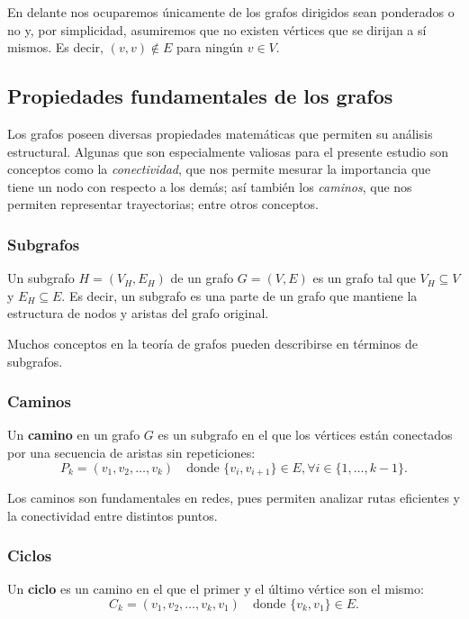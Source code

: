 \documentclass[openany]{book}
\begin{document}
			En delante nos ocuparemos únicamente de los grafos dirigidos sean ponderados o no y, por simplicidad, asumiremos que no existen vértices que se dirijan a sí mismos. Es decir, $(v, v) \notin E$ para ningún $v \in V$.

		
		\subsection{Propiedades fundamentales de los grafos}
			Los grafos poseen diversas propiedades matemáticas que permiten su análisis estructural.
			Algunas que son especialmente valiosas para el presente estudio son conceptos como la \textit{conectividad}, que nos permite mesurar la importancia que tiene un nodo con respecto a los demás; así también los \textit{caminos}, que nos permiten representar trayectorias; entre otros conceptos.
			
			\subsubsection{Subgrafos}
			
			Un subgrafo $H = (V_H, E_H)$ de un grafo $G = (V, E)$ es un grafo tal que $V_H \subseteq V$ y $E_H \subseteq E$.
			Es decir, un subgrafo es una parte de un grafo que mantiene la estructura de nodos y aristas del grafo original.
			
			Muchos conceptos en la teoría de grafos pueden describirse en términos de subgrafos.
			
			\subsubsection{Caminos}
			
			Un \textbf{camino} en un grafo $G$ es un subgrafo en el que los vértices están conectados por una secuencia de aristas sin repeticiones:
			\begin{equation}
				P_k = (v_1, v_2, \dots, v_k) \quad \text{donde } \{v_i, v_{i+1}\} \in E, \forall i \in \{1, \dots, k-1\}.
			\end{equation}
			
			Los caminos son fundamentales en redes, pues permiten analizar rutas eficientes y la conectividad entre distintos puntos.
			
			\subsubsection{Ciclos}
			
			Un \textbf{ciclo} es un camino en el que el primer y el último vértice son el mismo:
			\begin{equation}
				C_k = (v_1, v_2, \dots, v_k, v_1) \quad \text{donde } \{v_k, v_1\} \in E.
			\end{equation}
			
\end{document}
